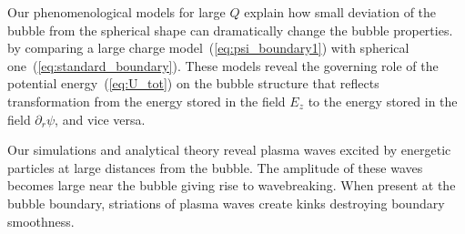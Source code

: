 \documentclass[twocolumn,showpacs,aip]{revtex4}
\begin{document}




Our 
phenomenological models for large $Q$ explain how small deviation of the bubble from the spherical shape can dramatically change the bubble properties.
 by comparing a large charge model~(\ref{eq:psi_boundary1}) with spherical one~(\ref{eq:standard_boundary}). 
These  models reveal  the governing role
 of the potential energy~(\ref{eq:U_tot})  on the bubble  structure that reflects  transformation from the energy stored in the  field $E_z$ to the energy stored in the field $\partial_r\psi$, and vice versa. 


Our simulations and analytical theory reveal plasma waves  excited by energetic particles at large distances from the bubble.
 The amplitude of these waves becomes large near the bubble  giving rise to  wavebreaking. When present at the bubble boundary, striations of plasma waves create kinks destroying boundary smoothness. 

\end{document}

